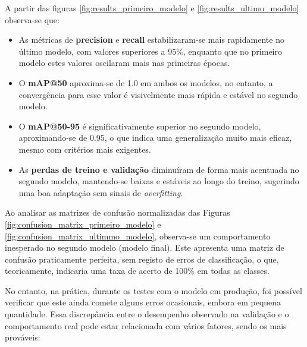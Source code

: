 A partir das figuras \ref{fig:results_primeiro_modelo} e \ref{fig:results_ultimo_modelo} observa-se que:

\begin{itemize}
    \item As métricas de \textbf{precision} e \textbf{recall} estabilizaram-se mais rapidamente no último modelo, com valores superiores a 95\%, enquanto que no primeiro modelo estes valores oscilaram mais nas primeiras épocas.
    
    \item O \textbf{mAP@50} aproxima-se de 1.0 em ambos os modelos, no entanto, a convergência para esse valor é visivelmente mais rápida e estável no segundo modelo.
    
    \item O \textbf{mAP@50-95} é significativamente superior no segundo modelo, aproximando-se de 0.95, o que indica uma generalização muito mais eficaz, mesmo com critérios mais exigentes.
    
    \item As \textbf{perdas de treino e validação} diminuíram de forma mais acentuada no segundo modelo, mantendo-se baixas e estáveis ao longo do treino, sugerindo uma boa adaptação sem sinais de \textit{overfitting}.
\end{itemize}


Ao analisar as matrizes de confusão normalizadas das Figuras \ref{fig:confusion_matrix_primeiro_modelo} e \ref{fig:confusion_matrix_ultimmo_modelo}, observa-se um comportamento inesperado no segundo modelo (modelo final). Este apresenta uma matriz de confusão praticamente perfeita, sem registo de erros de classificação, o que, teoricamente, indicaria uma taxa de acerto de 100\% em todas as classes.

No entanto, na prática, durante os testes com o modelo em produção, foi possível verificar que este ainda comete alguns erros ocasionais, embora em pequena quantidade. Essa discrepância entre o desempenho observado na validação e o comportamento real pode estar relacionada com vários fatores, sendo os mais prováveis:

